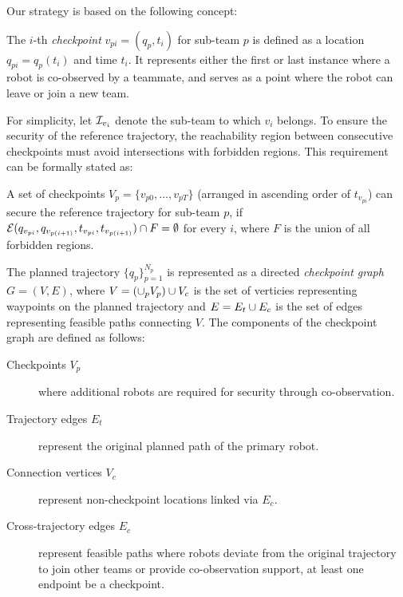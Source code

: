 \documentclass{article}
\newcommand{\news}{\color{blue}}
\begin{document}
{\news
Our strategy is based on the following concept:
\setcounter{definition}{5}
\setcounter{remark}{1}
\begin{definition}
The $i$-th \emph{checkpoint} $v_{pi}=(q_{p},t_{i})$ for sub-team $p$ is defined as a location $q_{pi}=q_{p}(t_i)$ and time $t_{i}$. It represents either the first or last instance where a robot is co-observed by a teammate, and serves as a point where the robot can leave or join a new team.
\end{definition}
For simplicity, let $\mathcal{I}_{v_{i}}$ denote the sub-team to which $v_{i}$ belongs. %
To ensure the security of the reference trajectory, the reachability region between consecutive checkpoints must avoid intersections with forbidden regions. This requirement can be formally stated as:
\begin{remark}\label{rmk:checkpoints}
  A set of checkpoints $V_{p}=\{ v_{p0}, \dots ,v_{pT}\}$ (arranged in ascending order of $t_{v_{pi}}$) can secure the reference trajectory for sub-team $p$, if $\mathcal{E}(q_{v_{pi}}, q_{v_{p(i+1)}}, t_{v_{pi}},t_{v_{p(i+1)}}) \cap F = \emptyset$ for every $i$, where $F$ is the union of all forbidden regions.
  \end{remark}
}
{\news 
\begin{definition}
  The planned trajectory $\{q_p\}_{p=1}^{N_p}$ is represented as a directed \emph{checkpoint graph} $G=(V, E)$, where $V = (\cup_p V_p) \cup V_c$ is the set of verticies representing waypoints on the planned trajectory and $E = E_{t} \cup E_{c}$ is the set of edges representing feasible paths connecting $V$. The components of the checkpoint graph are defined as follows:
  \begin{description}
    \item[Checkpoints $V_p$] where additional robots are required for security through co-observation.
    \item[Trajectory edges $E_t$] represent the original planned path of the primary robot.
    \item[Connection vertices $V_c$] represent non-checkpoint locations linked via $E_c$.
    \item[Cross-trajectory edges $E_c$] represent feasible paths where robots deviate from the original trajectory to join other teams or provide co-observation support, at least one endpoint be a checkpoint. 
  \end{description}
\end{definition}}
\end{document}
